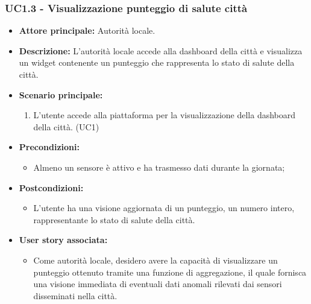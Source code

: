 \subsubsection{UC1.3 - Visualizzazione punteggio di salute città}
\begin{itemize}
    \item \textbf{Attore principale:} Autorità locale.
    \item \textbf{Descrizione:} L'autorità locale accede alla dashboard della città e visualizza un widget contenente un punteggio che rappresenta lo stato di salute della città.
    \item \textbf{Scenario principale:}
          \begin{enumerate}
            \item L'utente accede alla piattaforma per la visualizzazione della dashboard della città. (UC1)
        \end{enumerate}
    \item \textbf{Precondizioni:}
          \begin{itemize}
              \item Almeno un sensore è attivo e ha trasmesso dati durante la giornata;
          \end{itemize}
    \item \textbf{Postcondizioni:}
          \begin{itemize}
              \item      L'utente ha una visione aggiornata di un punteggio, un numero intero, rappresentante lo stato di salute della città.
          \end{itemize}
    \item \textbf{User story associata:}
          \begin{itemize}
              \item Come autorità locale, desidero avere la capacità di visualizzare un punteggio ottenuto tramite una funzione di aggregazione, il quale fornisca una visione immediata di eventuali dati anomali rilevati dai sensori disseminati nella città.
          \end{itemize}
\end{itemize}